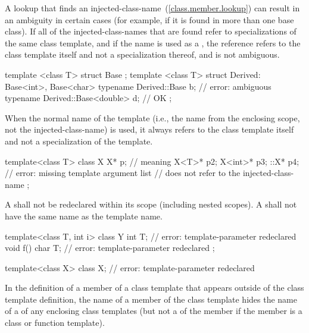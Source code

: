 \pnum
A lookup that finds an injected-class-name~(\ref{class.member.lookup}) can result in an ambiguity in
certain cases (for example, if it is found in more than one
base class).
If all of the injected-class-names that are
found refer to specializations of the same class template,
and if the name
is used as a ,
the reference refers to the class template itself and not a
specialization thereof, and is not ambiguous.
\enterexample

\begin{codeblock}
template <class T> struct Base { };
template <class T> struct Derived: Base<int>, Base<char> {
  typename Derived::Base b;             // error: ambiguous
  typename Derived::Base<double> d;     // OK
};
\end{codeblock}
\exitexample

\pnum
When the normal name of the template (i.e., the name from
the enclosing scope, not the injected-class-name) is
used,
it always refers to the class template itself and not a
specialization of the template.
\enterexample

\begin{codeblock}
template<class T> class X {
  X* p;             // meaning 
  X<T>* p2;
  X<int>* p3;
  ::X* p4;          // error: missing template argument list
                    //  does not refer to the injected-class-name
};
\end{codeblock}
\exitexample

\pnum
A
shall not be redeclared within its scope (including nested scopes).
A
shall not have the same name as the template name.
\enterexample

\begin{codeblock}
template<class T, int i> class Y {
  int T;            // error: template-parameter redeclared
  void f() {
    char T;         // error: template-parameter redeclared
  }
};

template<class X> class X;      // error: template-parameter redeclared
\end{codeblock}
\exitexample

\pnum
In the definition of a member of
a class template that appears outside of the class template definition,
the name of a member of the class template hides the name of a
of any enclosing class templates (but not a  of the
member if the member is a class or function template).
\enterexample

